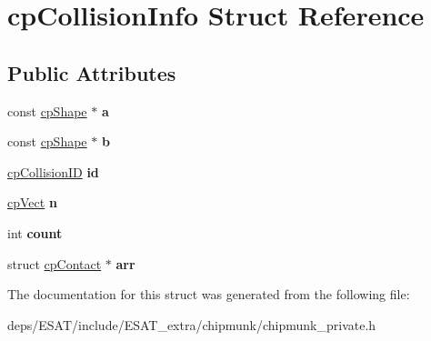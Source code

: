 \hypertarget{structcp_collision_info}{}\section{cp\+Collision\+Info Struct Reference}
\label{structcp_collision_info}
\subsection*{Public Attributes}
\begin{DoxyCompactItemize}
\item 
\mbox{\label{structcp_collision_info_ab48e25f52fb336fe3fb0dabc902db83f}} 
const \mbox{\hyperlink{structcp_shape}{cp\+Shape}} $\ast$ {\bfseries a}
\item 
\mbox{\label{structcp_collision_info_a28a567040d58ab040e586ecfb96b9267}} 
const \mbox{\hyperlink{structcp_shape}{cp\+Shape}} $\ast$ {\bfseries b}
\item 
\mbox{\label{structcp_collision_info_ae21c13411c400292c7f3f00e7a73b6c0}} 
\mbox{\hyperlink{group__basic_types_ga89d4043ca0567e947aaca19cf9600df5}{cp\+Collision\+ID}} {\bfseries id}
\item 
\mbox{\label{structcp_collision_info_aa8410869c111353cf2f33467fe4d2769}} 
\mbox{\hyperlink{structcp_vect}{cp\+Vect}} {\bfseries n}
\item 
\mbox{\label{structcp_collision_info_a3f57f91fb6890a08d00b75522a042153}} 
int {\bfseries count}
\item 
\mbox{\label{structcp_collision_info_a00b37d34592703cedabc98198de1db5f}} 
struct \mbox{\hyperlink{structcp_contact}{cp\+Contact}} $\ast$ {\bfseries arr}
\end{DoxyCompactItemize}


The documentation for this struct was generated from the following file\+:\begin{DoxyCompactItemize}
\item 
deps/\+E\+S\+A\+T/include/\+E\+S\+A\+T\+\_\+extra/chipmunk/chipmunk\+\_\+private.\+h\end{DoxyCompactItemize}
